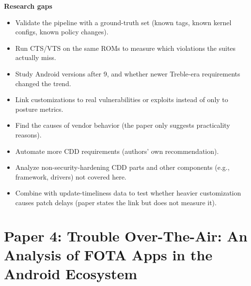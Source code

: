 \documentclass[11pt,a4paper]{article}
\begin{document}
\begin{enumerate}
    \vspace{4pt}
    \textbf{Research gaps}
    \begin{itemize}[leftmargin=*,itemsep=1pt,topsep=2pt]
        \item Validate the pipeline with a ground-truth set (known tags, known kernel configs, known policy changes).
        \item Run CTS/VTS on the same ROMs to measure which violations the suites actually miss.
        \item Study Android versions after 9, and whether newer Treble-era requirements changed the trend.
        \item Link customizations to real vulnerabilities or exploits instead of only to posture metrics.
        \item Find the causes of vendor behavior (the paper only suggests practicality reasons).
        \item Automate more CDD requirements (authors' own recommendation).
        \item Analyze non-security-hardening CDD parts and other components (e.g., framework, drivers) not covered here.
        \item Combine with update-timeliness data to test whether heavier customization causes patch delays (paper states the link but does not measure it).
    \end{itemize}

\end{enumerate}

\newpage

\section{Paper 4: Trouble Over-The-Air: An Analysis of FOTA Apps in the Android Ecosystem}
\end{document}
